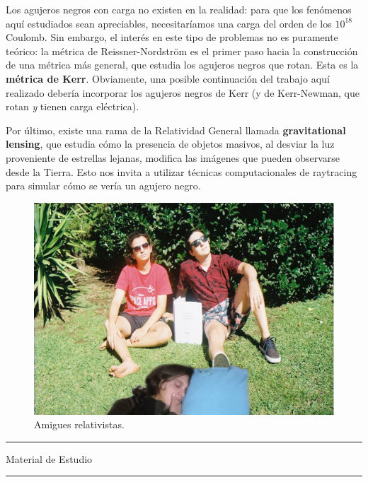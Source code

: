 \vspace{0.5cm}

Los agujeros negros con carga no existen en la realidad: para que los fenómenos aquí estudiados sean apreciables, necesitaríamos una carga del orden de los $10^{18}$ Coulomb. Sin embargo, el interés en este tipo de problemas no es puramente teórico: la métrica de Reissner-Nordström es el primer paso hacia la construcción de una métrica más general, que estudia los agujeros negros que rotan. Esta es la \textbf{métrica de Kerr}. Obviamente, una posible continuación del trabajo aquí realizado debería incorporar los agujeros negros de Kerr (y de Kerr-Newman, que rotan \textit{y} tienen carga eléctrica).

\vspace{0.5cm}

Por último, existe una rama de la Relatividad General llamada \textbf{gravitational lensing}, que estudia cómo la presencia de objetos masivos, al desviar la luz proveniente de estrellas lejanas, modifica las imágenes que pueden observarse desde la Tierra. Esto nos invita a utilizar técnicas computacionales de raytracing para simular cómo se vería un agujero negro.

\begin{figure}
    \centering
    \includegraphics[width=\textwidth]{Im/F1000033-01.jpeg}
    \caption{Amigues relativistas.}
    \label{fig:my_label}
\end{figure}

\newpage
\textcolor{black}{\hrule}
\vspace{0.5cm}
{\huge{Material de Estudio}}
\vspace{0.5cm}
\textcolor{black}{\hrule}



